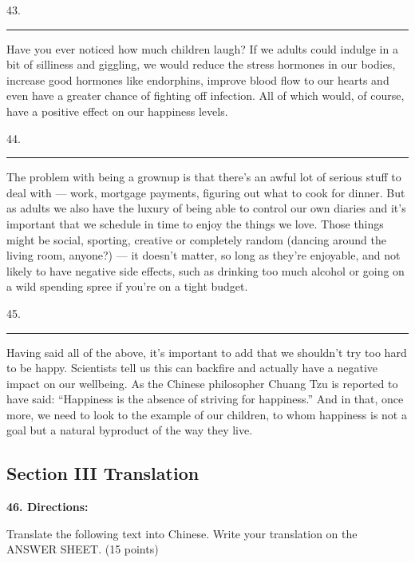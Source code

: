 \documentclass[UTF8,11pt]{ctexart}
\begin{document}
43. \par\noindent\rule{.95\linewidth}{.4pt}\par


Have you ever noticed how much children laugh? If we adults could indulge in a bit of silliness and giggling, we would reduce the stress hormones in our bodies, increase good hormones like endorphins, improve blood flow to our hearts and even have a greater chance of fighting off infection. All of which would, of course, have a positive effect on our happiness levels.


44. \par\noindent\rule{.95\linewidth}{.4pt}\par


The problem with being a grownup is that there’s an awful lot of serious stuff to deal with — work, mortgage payments, figuring out what to cook for dinner. But as adults we also have the luxury of being able to control our own diaries and it’s important that we schedule in time to enjoy the things we love. Those things might be social, sporting, creative or completely random (dancing around the living room, anyone?) — it doesn’t matter, so long as they’re enjoyable, and not likely to have negative side effects, such as drinking too much alcohol or going on a wild spending spree if you’re on a tight budget.


45. \par\noindent\rule{.95\linewidth}{.4pt}\par


Having said all of the above, it’s important to add that we shouldn’t try too hard to be happy. Scientists tell us this can backfire and actually have a negative impact on our wellbeing. As the Chinese philosopher Chuang Tzu is reported to have said: “Happiness is the absence of striving for happiness.” And in that, once more, we need to look to the example of our children, to whom happiness is not a goal but a natural byproduct of the way they live.


\subsection*{\textbf{Section III Translation}}


\textbf{46. Directions:}


Translate the following text into Chinese. Write your translation on the ANSWER SHEET. (15 points)
\end{document}
